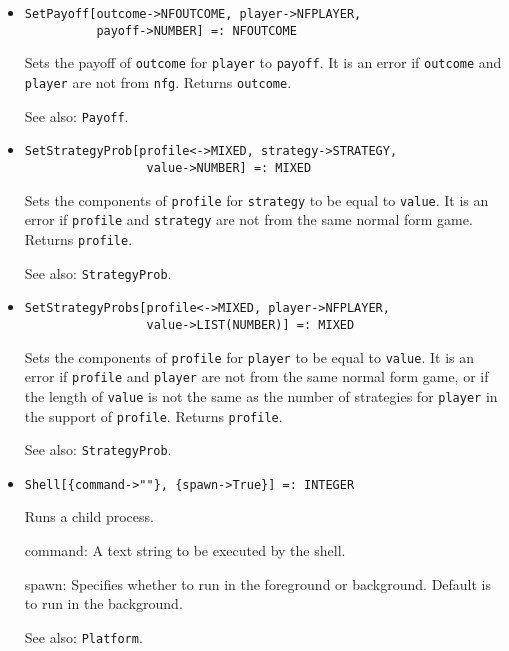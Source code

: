 \begin{itemize}
\item{}
\protect \large \begin{verbatim}
SetPayoff[outcome->NFOUTCOME, player->NFPLAYER, 
          payoff->NUMBER] =: NFOUTCOME 
\end{verbatim}\normalsize

\bd
Sets the payoff of \verb+outcome+ for \verb+player+ to \verb+payoff+.
It is an error if \verb+outcome+ and \verb+player+ are not from \verb+nfg+.
Returns \verb+outcome+.
\item [See also:] \verb+Payoff+.
\ed

\item{} 
\protect \large \begin{verbatim}
SetStrategyProb[profile<->MIXED, strategy->STRATEGY, 
                 value->NUMBER] =: MIXED 
\end{verbatim} \normalsize

\bd
Sets the components of \verb+profile+ for \verb+strategy+ to be equal
to \verb+value+.  It is an error if \verb+profile+ and \verb+strategy+
are not from the same normal form game.  Returns \verb+profile+.
\item [See also:] \verb+StrategyProb+.
\ed

\item{} 
\protect \large \begin{verbatim}
SetStrategyProbs[profile<->MIXED, player->NFPLAYER, 
                 value->LIST(NUMBER)] =: MIXED 
\end{verbatim} \normalsize

\bd
Sets the components of \verb+profile+ for \verb+player+ to be equal
to \verb+value+.  It is an error if \verb+profile+ and \verb+player+
are not from the same normal form game, or if the length of \verb+value+
is not the same as the number of strategies for \verb+player+ in the
support of \verb+profile+.  Returns \verb+profile+.
\item [See also:] \verb+StrategyProb+.
\ed

\item{}
\protect \large \begin{verbatim}
Shell[{command->""}, {spawn->True}] =: INTEGER 
\end{verbatim} \normalsize

\bd
Runs a child process.  
\bd
\item [command:] A text string to be executed by the shell.  
\item [spawn:] Specifies whether to run in the foreground or
background.  Default is to run in the background.  
\ed
\item [See also:] \verb+Platform+.
\ed


\end{itemize}

